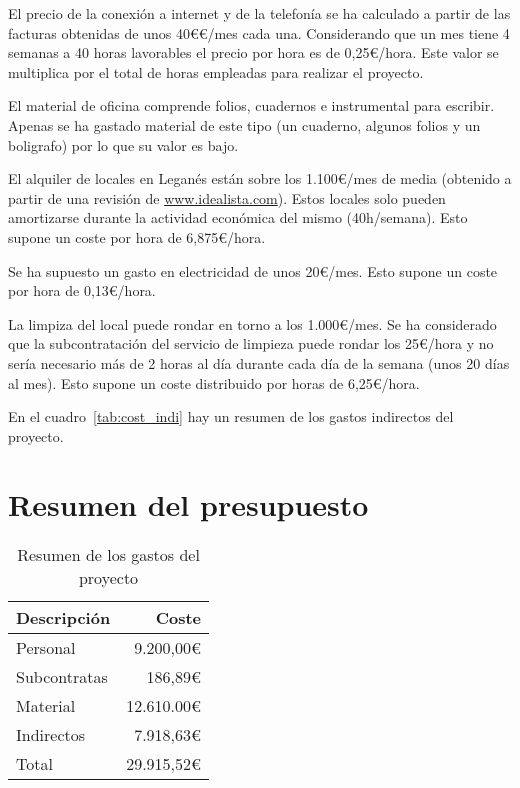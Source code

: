 El precio de la conexión a internet y de la telefonía se ha calculado a partir de las facturas obtenidas de unos 40€\euro/mes cada una. Considerando que un mes tiene 4 semanas a 40 horas lavorables el precio por hora es de 0,25\euro/hora. Este valor se multiplica por el total de horas empleadas para realizar el proyecto.

El material de oficina comprende folios, cuadernos e instrumental para escribir. Apenas se ha gastado material de este tipo (un cuaderno, algunos folios y un boligrafo) por lo que su valor es bajo.

El alquiler de locales en Leganés están sobre los 1.100\euro/mes de media (obtenido a partir de una revisión de \url{www.idealista.com}). Estos locales solo pueden amortizarse durante la actividad económica del mismo (40h/semana). Esto supone un coste por hora de 6,875\euro/hora.

Se ha supuesto un gasto en electricidad de unos 20\euro/mes. Esto supone un coste por hora de 0,13\euro/hora.

La limpiza del local puede rondar en torno a los 1.000\euro/mes. Se ha considerado que la subcontratación del servicio de limpieza puede rondar los 25\euro/hora y no sería necesario más de 2 horas al día durante cada día de la semana (unos 20 días al mes). Esto supone un coste distribuido por horas de 6,25\euro/hora.

En el cuadro~\ref{tab:cost_indi} hay un resumen de los gastos indirectos del proyecto.

\section{Resumen del presupuesto}

\begin{table}
	\centering
	
	\begin{tabular}{|l|r|}
		\hline
		Descripción        & Coste  \\
		\hline
		Personal & 9.200,00\euro \\
		\hline
		Subcontratas        & 186,89\euro \\
		\hline
		Material     & 12.610.00\euro\\
		\hline
		Indirectos & 7.918,63\euro\\
		\hline
		\hline
		Total              & 29.915,52\euro\\
		\hline
	\end{tabular}
	\caption{Resumen de los gastos del proyecto}\label{tab:resu_gastos}
\end{table}

